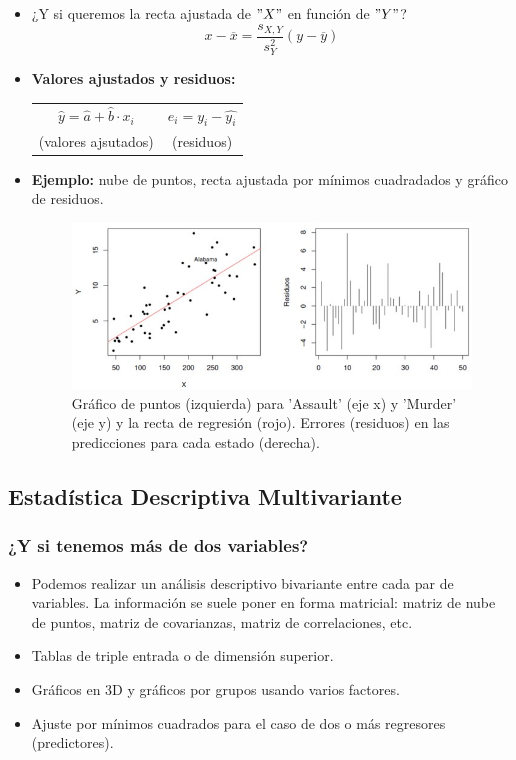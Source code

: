 \begin{itemize}
	\item ¿Y si queremos la recta ajustada de $"X"$ en función de $"Y"$? $$x-\overline{x}=\frac{s_{X,Y}}{s_{Y}^{2}}(y-\overline{y})$$ 
	\item \textbf{Valores ajustados y residuos:} \begin{center}
		\begin{tabular}{cc}
			$\hat{y}=\hat{a}+\hat{b}\cdot x_{i}$ & $e_{i}=y_{i}-\hat{y_{i}}$\\
			(valores ajsutados) & (residuos)
		\end{tabular}
	\end{center}
	\item \textbf{Ejemplo:} nube de puntos, recta ajustada por mínimos cuadradados y gráfico de residuos. 
	\begin{figure}[h]
		\centering
		\includegraphics[width=0.8\linewidth]{"Temas/Imagenes/Tema 2/graficos de puntos"}
		\caption*{Gráfico de puntos (izquierda) para 'Assault' (eje x) y 'Murder' (eje y) y la recta de regresión (rojo). Errores (residuos) en las predicciones para cada estado (derecha).}
	\end{figure}
\end{itemize}
\subsection{Estadística Descriptiva Multivariante}
\subsubsection*{¿Y si tenemos más de dos variables?}
\begin{itemize}
	\item Podemos realizar un análisis descriptivo bivariante entre cada par de variables. La información se suele poner en forma matricial: matriz de nube de puntos, matriz de covarianzas, matriz de correlaciones, etc.
	\item Tablas de triple entrada o de dimensión superior.
	\item Gráficos en 3D y gráficos por grupos usando varios factores.
	\item Ajuste por mínimos cuadrados para el caso de dos o más regresores (predictores).
\end{itemize}